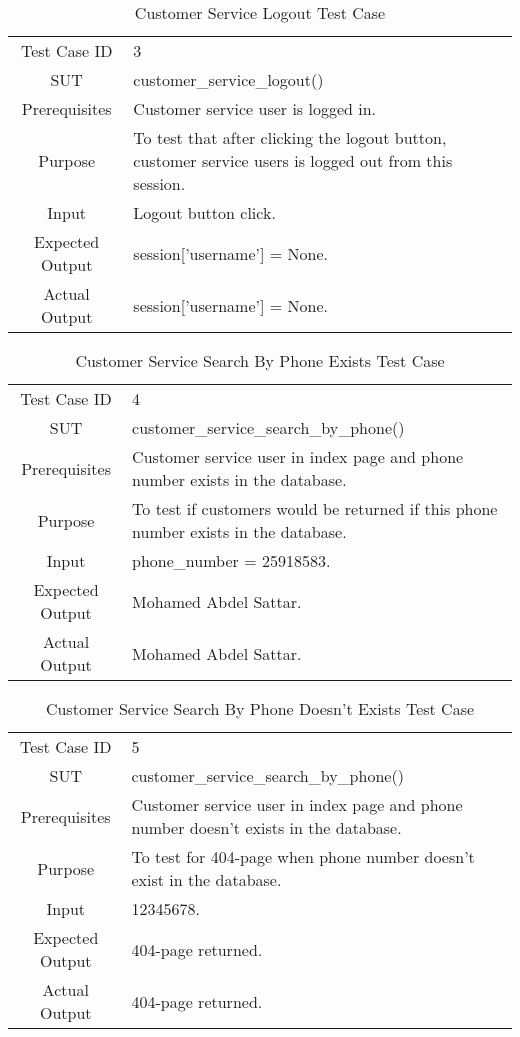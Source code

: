 	\begin{table}[H]
		\centering
		\renewcommand{\arraystretch}{1.5}
		\begin{tabular}[t]{ c  m{10cm} }
			Test Case ID & 3  \\
			SUT &  customer\_service\_logout() \\
			Prerequisites & Customer service user is logged in. \\
			Purpose & To test that after clicking the logout button, customer service users is logged out from this session.\\
			Input &  Logout button click.\\
			Expected Output &  session['username'] = None.\\
			Actual Output & session['username'] = None. \\
		\end{tabular}
		\caption{Customer Service Logout Test Case}
		\renewcommand{\arraystretch}{1.0}
	\end{table}
	
	\begin{table}[H]
		\centering
		\renewcommand{\arraystretch}{1.5}
		\begin{tabular}[t]{ c  m{10cm} }
			Test Case ID & 4  \\
			SUT &  customer\_service\_search\_by\_phone() \\
			Prerequisites &  Customer service user in index page and phone number exists in the database. \\
			Purpose & To test if customers would be returned if this phone number exists in the database. \\
			Input &  phone\_number = 25918583. \\
			Expected Output &  Mohamed Abdel Sattar. \\
			Actual Output & Mohamed Abdel Sattar. \\
		\end{tabular}
		\caption{Customer Service Search By Phone Exists Test Case}
		\renewcommand{\arraystretch}{1.0}
	\end{table}
	
	\begin{table}[H]
		\centering
		\renewcommand{\arraystretch}{1.5}
		\begin{tabular}[t]{ c  m{10cm} }
			Test Case ID & 5 \\
			SUT & customer\_service\_search\_by\_phone() \\
			Prerequisites &  Customer service user in index page and phone number doesn't exists in the database. \\
			Purpose & To test for 404-page when phone number doesn't exist in the database. \\
			Input &  12345678. \\
			Expected Output &  404-page returned. \\
			Actual Output & 404-page returned. \\
		\end{tabular}
		\caption{Customer Service Search By Phone Doesn't Exists Test Case}
		\renewcommand{\arraystretch}{1.0}
	\end{table}
	
